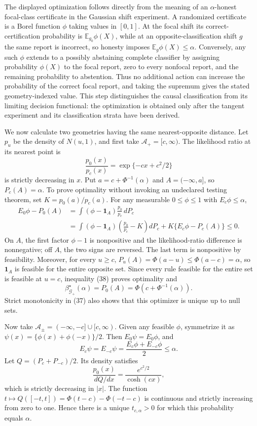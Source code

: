The displayed optimization follows directly from the meaning of an \(\alpha\)-honest focal-class certificate in the Gaussian shift experiment.  A randomized certificate is a Borel function \(\phi\) taking values in \([0,1]\).  At the focal shift its correct-certification probability is \(\mathbb E_{g_0}\phi(X)\), while at an opposite-classification shift \(g\) the same report is incorrect, so honesty imposes \(\mathbb E_g\phi(X)\le\alpha\).  Conversely, any such \(\phi\) extends to a possibly abstaining complete classifier by assigning probability \(\phi(X)\) to the focal report, zero to every nonfocal report, and the remaining probability to abstention.  Thus no additional action can increase the probability of the correct focal report, and taking the supremum gives the stated geometry-indexed value.  This step distinguishes the causal classification from its limiting decision functional: the optimization is obtained only after the tangent experiment and its classification strata have been derived.

We now calculate two geometries having the same nearest-opposite distance.  Let \(p_u\) be the density of \(N(u,1)\), and first take \(\mathcal A_+=[c,\infty)\).  The likelihood ratio at its nearest point is
\[
 \frac{p_0(x)}{p_c(x)}=\exp\{-cx+c^2/2\} \tag{37}
\]
is strictly decreasing in \(x\).  Put \(a=c+\Phi^{-1}(\alpha)\) and \(A=(-\infty,a]\), so \(P_c(A)=\alpha\).  To prove optimality without invoking an undeclared testing theorem, set \(K=p_0(a)/p_c(a)\).  For any measurable \(0\le\phi\le1\) with \(E_c\phi\le\alpha\),
\[
 \begin{aligned}
 E_0\phi-P_0(A)
 &=\int(\phi-\mathbf1_A)\frac{p_0}{p_c}\,dP_c\\
 &=\int(\phi-\mathbf1_A)\left(\frac{p_0}{p_c}-K\right)dP_c
   +K\{E_c\phi-P_c(A)\}\le0. 
 \end{aligned} \tag{38}
\]
On \(A\), the first factor \(\phi-1\) is nonpositive and the likelihood-ratio difference is nonnegative; off \(A\), the two signs are reversed.  The last term is nonpositive by feasibility.  Moreover, for every \(u\ge c\),
\(P_u(A)=\Phi(a-u)\le\Phi(a-c)=\alpha\), so \(\mathbf1_A\) is feasible for the entire opposite set.  Since every rule feasible for the entire set is feasible at \(u=c\), inequality (38) proves optimality and
\[
 \beta^{\star}_{\mathcal G_+}(\alpha)=P_0(A)
 =\Phi(c+\Phi^{-1}(\alpha)). \tag{39}
\]
Strict monotonicity in (37) also shows that this optimizer is unique up to null sets.

Now take \(\mathcal A_{\pm}=(-\infty,-c]\cup[c,\infty)\).  Given any feasible \(\phi\), symmetrize it as
\(\psi(x)=\{\phi(x)+\phi(-x)\}/2\).  Then \(E_0\psi=E_0\phi\), and
\[
 E_c\psi=E_{-c}\psi=\frac{E_c\phi+E_{-c}\phi}{2}\le\alpha. \tag{40}
\]
Let \(Q=(P_c+P_{-c})/2\).  Its density satisfies
\[
 \frac{p_0(x)}{dQ/dx}
 =\frac{e^{c^2/2}}{\cosh(cx)}, \tag{41}
\]
which is strictly decreasing in \(|x|\).  The function
\(t\mapsto Q([-t,t])=\Phi(t-c)-\Phi(-t-c)\) is continuous and strictly increasing from zero to one.  Hence there is a unique \(t_{c,\alpha}>0\) for which this probability equals \(\alpha\).

